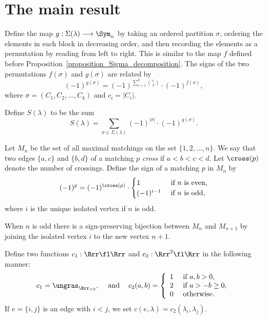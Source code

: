 \section{The main result}
\label{section_main_result}

Define the map
$g : \Sigma(\lambda) \longrightarrow \Sym_{n}$
by taking  an ordered partition $\sigma$,
ordering the elements in each block in decreasing order,
and then
recording the elements as a permutation by reading from left to right.
This is similar to the map $f$ defined before
Proposition~\ref{proposition_Sigma_decomposition}.
The signs of the two permutations $f(\sigma)$ and $g(\sigma)$
are related by
$$
 (-1)^{g(\sigma)} = (-1)^{\sum_{i=1}^{k} \binom{c_{i}}{2}} \cdot (-1)^{f(\sigma)} ,
$$
where $\sigma = (C_{1},C_{2}, \ldots, C_{k})$ and $c_{i} = |C_{i}|$.

Define $S(\lambda)$ to be the sum
\begin{equation}
S(\lambda)
=
\sum_{\sigma \in \Sigma(\lambda)}
(-1)^{|\sigma|} \cdot (-1)^{g(\sigma)} . 
\label{equation_S_lambda}
\end{equation}


Let $M_{n}$ be the set of all
maximal matchings
on the set $\{1,2, \ldots,n\}$.
We say that two edges $\{a,c\}$ and $\{b,d\}$ of a matching $p$
\emph{cross} if $a<b<c<d$. Let $\cross(p)$ denote the number of crossings.
Define the sign of a matching $p$ in $M_{n}$
by
$$   (-1)^{p} = (-1)^{\cross(p)} \cdot
\begin{cases}
1 & \text{ if $n$ is even,} \\
(-1)^{i-1} & \text{ if $n$ is odd,}
\end{cases}
$$
where $i$ is the unique isolated vertex if $n$ is odd.

\begin{remark}
{\rm
When $n$ is odd
there is a sign-preserving bijection
between $M_{n}$ and $M_{n+1}$
by joining the isolated vertex $i$ to the new vertex $n+1$.
}
\label{remark_add_extra_edge}
\end{remark}








Define two functions $c_{1} : \Rrr \fl \Rrr$ and
$c_{2} : \Rrr^{2} \fl \Rrr$ in the following manner:
\[c_{1}=\ungras_{\Rrr_{>0}},
\:\:\:\: \text{ and } \:\:\:\:
c_{2}(a,b)=\left\{\begin{array}{ll}1 & \mbox{ if }a,b>0, \\
2 & \mbox{ if } a > -b \geq 0, \\
0 & \mbox{ otherwise.}\end{array}\right.\]
If $e=\{i,j\}$ is an edge with $i<j$, we set
$c(e,\lambda)=c_{2}(\lambda_{i},\lambda_{j})$.

